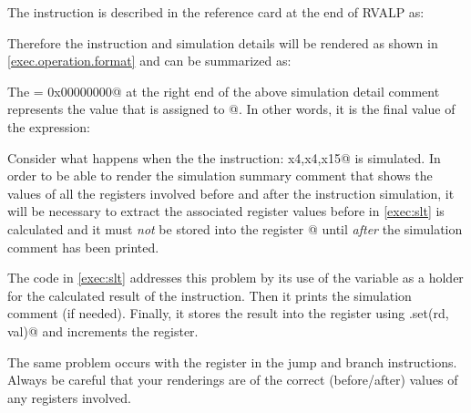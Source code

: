 \documentclass{article}
\begin{document}
\begin{itemize}
The \verb@slt@ instruction is described in the reference card at the end of RVALP as:

\hspace*{2cm}{\tt rd $\leftarrow$ (rs1 < rs2) ? 1 : 0, pc $\leftarrow$ pc+4}

Therefore the instruction and simulation details will be rendered as shown in \autoref{exec.operation.format} 
and can be summarized as:

\hspace*{2cm}{\small
\verb@slt x4,x14,x15 // x4 = (0xf0f0f0f0 < 0xf0f0f0f0) ? 1 : 0 = 0x00000000@
}

The \verb@= 0x00000000@ at the right end of the above simulation detail comment 
represents the value that is assigned to @.  In other words, it is the 
final value of the expression: 

\hspace*{2cm}{\small\verb@(0xf0f0f0f0 < 0xf0f0f0f0) ? 1 : 0@}

Consider what happens when the the instruction: \verb@slt x4,x4,x15@ is simulated.
In order to be able to render the simulation summary comment that shows the values of all the registers
involved before and after the instruction simulation, it will be necessary to extract the associated
register values before \verb@val@ in \autoref{exec:slt} is calculated and it must {\em not}
be stored into the \verb@rd@ register @ until {\em after} the simulation comment has been printed.

The code in \autoref{exec:slt} addresses this problem by its use of the \verb@val@ variable
as a holder for the calculated result of the instruction.  Then it prints the simulation
comment (if needed).  Finally, it stores the result into the \verb@rd@ register
using \verb@regs.set(rd, val)@ and increments the \verb@pc@ register.


The same problem occurs with the \verb@pc@ register in the jump and branch instructions.  
Always be careful that your renderings are of the correct (before/after) values of any registers 
involved.

\end{itemize}
\end{document}
